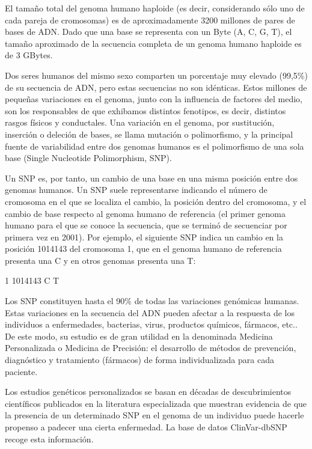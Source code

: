 El tamaño total del genoma humano haploide (es decir, considerando sólo uno de cada pareja de cromosomas) es de aproximadamente 3200 millones de pares de bases de A\+DN. Dado que una base se representa con un Byte (\textquotesingle{}A\textquotesingle{}, \textquotesingle{}C\textquotesingle{}, \textquotesingle{}G\textquotesingle{}, \textquotesingle{}T\textquotesingle{}), el tamaño aproximado de la secuencia completa de un genoma humano haploide es de 3 G\+Bytes.

Dos seres humanos del mismo sexo comparten un porcentaje muy elevado (99,5\%) de su secuencia de A\+DN, pero estas secuencias no son idénticas. Estos millones de pequeñas variaciones en el genoma, junto con la influencia de factores del medio, son los responsables de que exhibamos distintos fenotipos, es decir, distintos rasgos físicos y conductales. Una variación en el genoma, por sustitución, inserción o deleción de bases, se llama mutación o polimorfismo, y la principal fuente de variabilidad entre dos genomas humanos es el polimorfismo de una sola base (Single Nucleotide Polimorphism, S\+NP).

Un S\+NP es, por tanto, un cambio de una base en una misma posición entre dos genomas humanos. Un S\+NP suele representarse indicando el número de cromosoma en el que se localiza el cambio, la posición dentro del cromosoma, y el cambio de base respecto al genoma humano de referencia (el primer genoma humano para el que se conoce la secuencia, que se terminó de secuenciar por primera vez en 2001). Por ejemplo, el siguiente S\+NP indica un cambio en la posición 1014143 del cromosoma 1, que en el genoma humano de referencia presenta una \textquotesingle{}C\textquotesingle{} y en otros genomas presenta una \textquotesingle{}T\textquotesingle{}\+:


\begin{DoxyCode}
1 1014143 C T
\end{DoxyCode}


Los S\+NP constituyen hasta el 90\% de todas las variaciones genómicas humanas. Estas variaciones en la secuencia del A\+DN pueden afectar a la respuesta de los individuos a enfermedades, bacterias, virus, productos químicos, fármacos, etc.. De este modo, su estudio es de gran utilidad en la denominada Medicina Personalizada o Medicina de Precisión\+: el desarrollo de métodos de prevención, diagnóstico y tratamiento (fármacos) de forma individualizada para cada paciente.

Los estudios genéticos personalizados se basan en décadas de descubrimientos científicos publicados en la literatura especializada que muestran evidencia de que la presencia de un determinado S\+NP en el genoma de un individuo puede hacerle propenso a padecer una cierta enfermedad. La base de datos Clin\+Var-\/db\+S\+NP recoge esta información.

